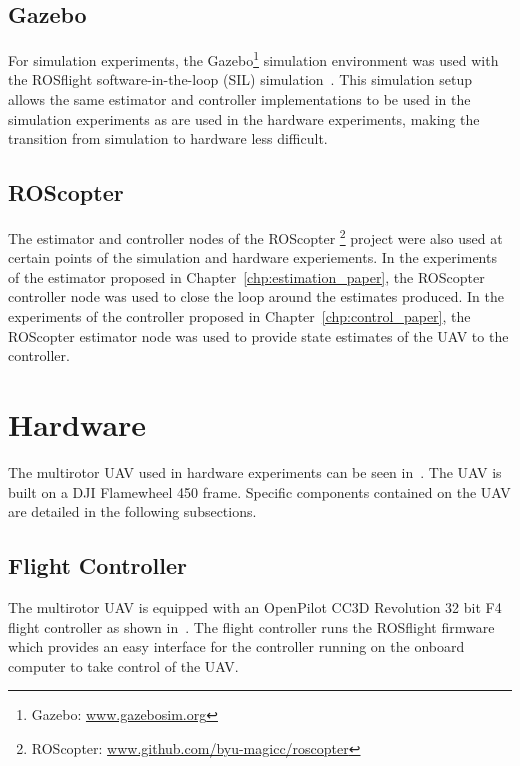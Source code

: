 \subsection {Gazebo}
For simulation experiments, the Gazebo\footnote{Gazebo:
\href{www.gazebosim.org}{www.gazebosim.org}} simulation environment was used with the ROSflight software-in-the-loop
(SIL) simulation~\cite{jackson2016rosflight}. This simulation setup allows the
same estimator and controller implementations to
be used in the simulation experiments as are used in the hardware experiments,
making the transition from simulation to hardware less difficult.

\subsection {ROScopter}
The estimator and controller nodes of the ROScopter
\footnote{ROScopter:
\href{www.github.com/byu-magicc/roscopter}{www.github.com/byu-magicc/roscopter}}
project were also used at certain points of the simulation and hardware
experiements. In the experiments of the estimator proposed  in
Chapter~\ref{chp:estimation_paper}, the ROScopter controller node was used to
close the loop around the estimates produced. In the experiments of the 
controller proposed in Chapter~\ref{chp:control_paper}, the ROScopter estimator node
was used to provide state estimates of the UAV to the controller.

\section{Hardware}
The multirotor UAV used in hardware experiments can be seen
in~. The UAV is built on a DJI Flamewheel 450 frame.
Specific components contained on the UAV are detailed in the following
subsections.

\subsection{Flight Controller}
The multirotor UAV is equipped with an OpenPilot CC3D Revolution 32 bit F4
flight controller as shown in~. The flight controller runs the
ROSflight firmware~\cite{jackson2016rosflight} which provides an easy interface
for the controller running on the onboard computer to take control of the UAV.

